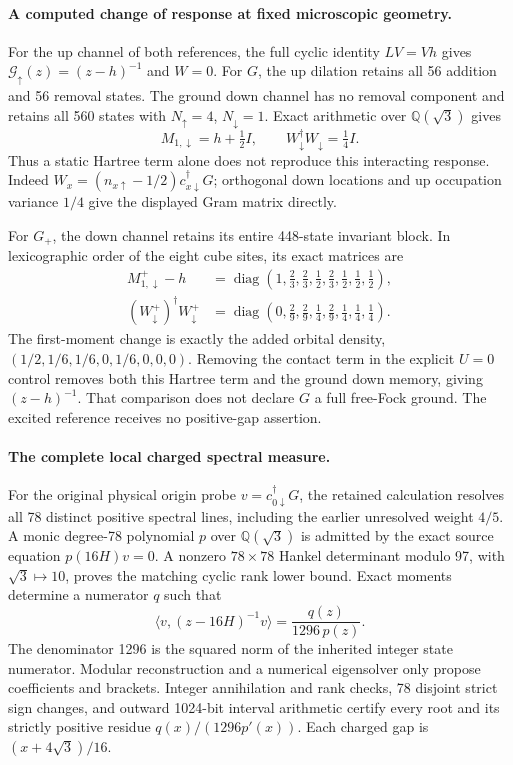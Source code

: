 \paragraph{A computed change of response at fixed microscopic geometry.}
For the up channel of both references, the full cyclic identity $LV=Vh$
gives $\mathcal G_\uparrow(z)=(z-h)^{-1}$ and $W=0$.
For $G$, the up dilation retains all 56 addition and 56 removal states.
The ground down channel has no removal component and retains all 560 states
with $N_\uparrow=4$, $N_\downarrow=1$.  Exact arithmetic over
$\mathbb Q(\sqrt3)$ gives
\[
M_{1,\downarrow}=h+\tfrac12 I,
\qquad W_\downarrow^\dagger W_\downarrow=\tfrac14 I.
\]
Thus a static Hartree term alone does not reproduce this interacting
response.  Indeed $W_x=(n_{x\uparrow}-1/2)c_{x\downarrow}^\dagger G$;
orthogonal down locations and up occupation variance $1/4$ give the
displayed Gram matrix directly.

For $G_+$, the down channel retains its entire 448-state invariant block.
In lexicographic order of the eight cube sites, its exact matrices are
\begin{align*}
M_{1,\downarrow}^{+}-h
 &=\operatorname{diag}(1,\tfrac23,\tfrac23,\tfrac12,
                          \tfrac23,\tfrac12,\tfrac12,\tfrac12),\\
(W_\downarrow^{+})^\dagger W_\downarrow^{+}
 &=\operatorname{diag}(0,\tfrac29,\tfrac29,\tfrac14,
                          \tfrac29,\tfrac14,\tfrac14,\tfrac14).
\end{align*}
The first-moment change is exactly the added orbital density,
$(1/2,1/6,1/6,0,1/6,0,0,0)$.  Removing the contact term in the explicit
$U=0$ control removes both this Hartree term and the ground down memory,
giving $(z-h)^{-1}$.  That comparison does not declare $G$ a full free-Fock
ground.  The excited reference receives no positive-gap assertion.

\paragraph{The complete local charged spectral measure.}
For the original physical origin probe $v=c_{0\downarrow}^\dagger G$,
the retained calculation resolves all 78 distinct positive spectral
lines, including the earlier unresolved weight $4/5$.
A monic degree-78 polynomial $p$ over $\mathbb Q(\sqrt3)$ is admitted by
the exact source equation $p(16H)v=0$.  A nonzero $78\times78$ Hankel
determinant modulo 97, with $\sqrt3\mapsto10$, proves the matching cyclic
rank lower bound.  Exact moments determine a numerator $q$ such that
\[
 \langle v,(z-16H)^{-1}v\rangle
       =\frac{q(z)}{1296\,p(z)}.
\]
The denominator 1296 is the squared norm of the inherited integer state
numerator.  Modular reconstruction and a numerical eigensolver only
propose coefficients and brackets.  Integer annihilation and rank checks,
78 disjoint strict sign changes, and outward 1024-bit interval arithmetic
certify every root and its strictly positive residue
$q(x)/(1296p'(x))$.  Each charged gap is $(x+4\sqrt3)/16$.

